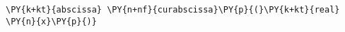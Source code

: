 \begin{Verbatim}[commandchars=\\\{\}]
    \PY{k+kt}{abscissa} \PY{n+nf}{curabscissa}\PY{p}{(}\PY{k+kt}{real} \PY{n}{x}\PY{p}{)}
\end{Verbatim}
